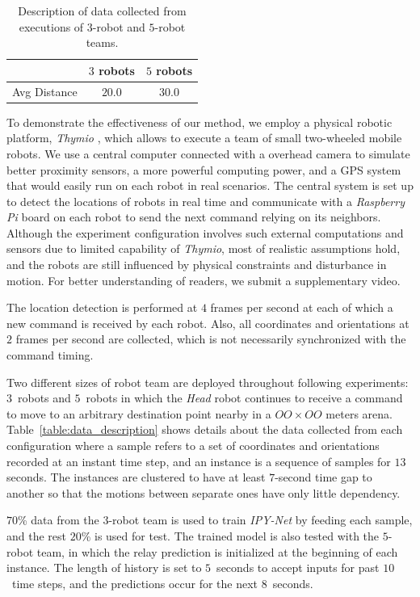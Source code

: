 \documentclass[letterpaper, 10 pt, conference]{ieeeconf}  %
\begin{document}
	\begin{table}[]
		\label{table:overall_performance}
		\centering
		\begin{tabular}{|c|c|c|}
			\hline
			&  $3$ robots & $5$ robots  \\ \hline
			Avg Distance & $20.0$ & $30.0$  \\ \hline
		\end{tabular}	
		\caption{Description of data collected from executions of $3$-robot and $5$-robot teams.}
	\end{table}
	
	
	To demonstrate the effectiveness of our method, we employ a physical robotic platform, 
	\emph{Thymio} \cite{Shin14}, which allows to execute a team of small two-wheeled mobile robots.   
	We use a central computer connected with a overhead camera to simulate better proximity 
	sensors, a more powerful computing power, and a GPS system that would easily run on each robot in 
	real scenarios. The central system is set up to detect the locations of robots in real time 
	and communicate with a \emph{Raspberry Pi} board \cite{Upton14} on each robot to send
	the next command relying on its neighbors. Although the experiment configuration involves 
	such external computations and sensors due to limited capability of \emph{Thymio}, 
	most of realistic assumptions hold, and the robots are still influenced by 
	physical constraints and disturbance in motion. For better understanding of readers, 
	we submit a supplementary video. 
	
	The location detection is performed at $4$ frames per second at each of which 
	a new command is received by each robot. Also, 
	all coordinates and orientations at $2$ frames per second are collected, which 
	is not necessarily synchronized with the command timing. 
	
	Two different sizes of robot team are deployed throughout following experiments: 
	$3$~robots and $5$~robots in which the \emph{Head} robot continues to receive a command to 
	move to an arbitrary destination point nearby in a $OO \times OO$ meters arena. 
	Table~\ref{table:data_description} shows details about the data collected from 
	each configuration where a sample refers to a set of coordinates and orientations recorded 
	at an instant time step, and an instance is a sequence of samples for $13$ seconds. 
	The instances are clustered to have at least $7$-second time gap to another so that
	the motions between separate ones have only little dependency. 
	
	$70$\% data from the $3$-robot team is used to train \emph{IPY-Net} by feeding each sample, 
	and the rest $20$\% is used for test. 
	The trained model is also tested with the $5$-robot team, in which the relay prediction is 
	initialized at the beginning of each instance. 
	The length of history is set to $5$~seconds to accept inputs for past $10$~time steps, and 
	the predictions occur for the next $8$~seconds.  
	 	
\end{document}
